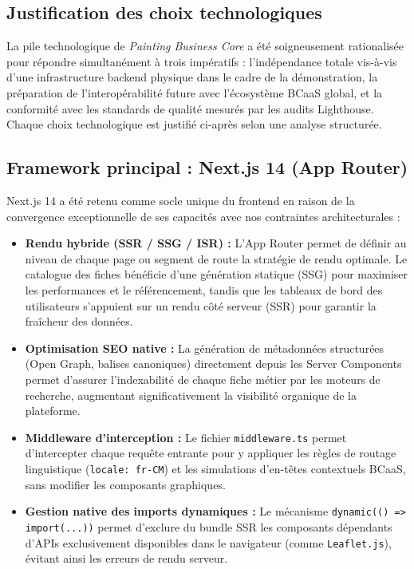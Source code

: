 \documentclass[12pt,a4paper]{report}
\begin{document}
\subsection{Justification des choix technologiques}

La pile technologique de \textit{Painting Business Core} a été soigneusement rationalisée pour répondre simultanément à trois impératifs : l'indépendance totale vis-à-vis d'une infrastructure backend physique dans le cadre de la démonstration, la préparation de l'interopérabilité future avec l'écosystème BCaaS global, et la conformité avec les standards de qualité mesurés par les audits Lighthouse. Chaque choix technologique est justifié ci-après selon une analyse structurée.

\subsection{Framework principal : Next.js 14 (App Router)}

Next.js 14 a été retenu comme socle unique du frontend en raison de la convergence exceptionnelle de ses capacités avec nos contraintes architecturales :

\begin{itemize}[leftmargin=1.5cm, itemsep=5pt]
    \item \textbf{Rendu hybride (SSR / SSG / ISR) :} L'App Router permet de définir au niveau de chaque page ou segment de route la stratégie de rendu optimale. Le catalogue des fiches bénéficie d'une génération statique (SSG) pour maximiser les performances et le référencement, tandis que les tableaux de bord des utilisateurs s'appuient sur un rendu côté serveur (SSR) pour garantir la fraîcheur des données.
    \item \textbf{Optimisation SEO native :} La génération de métadonnées structurées (Open Graph, balises canoniques) directement depuis les Server Components permet d'assurer l'indexabilité de chaque fiche métier par les moteurs de recherche, augmentant significativement la visibilité organique de la plateforme.
    \item \textbf{Middleware d'interception :} Le fichier \texttt{middleware.ts} permet d'intercepter chaque requête entrante pour y appliquer les règles de routage linguistique (\texttt{locale: fr-CM}) et les simulations d'en-têtes contextuels BCaaS, sans modifier les composants graphiques.
    \item \textbf{Gestion native des imports dynamiques :} Le mécanisme \texttt{dynamic(() => import(...))} permet d'exclure du bundle SSR les composants dépendants d'APIs exclusivement disponibles dans le navigateur (comme \texttt{Leaflet.js}), évitant ainsi les erreurs de rendu serveur.
\end{itemize}
\end{document}
